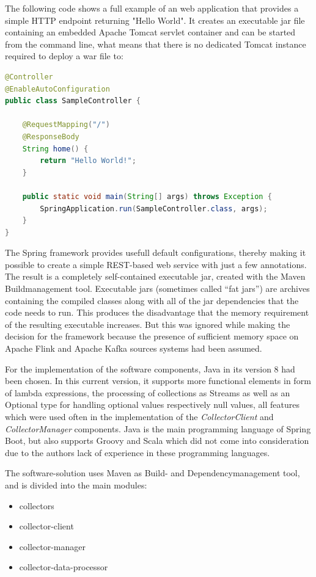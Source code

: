 The following code shows a full example of an web application that provides a simple
HTTP endpoint returning "Hello World". It creates an executable jar file containing
an embedded Apache Tomcat servlet container and can be started from the command line, what means that there is no
dedicated Tomcat instance required to deploy a war file to:
\begin{lstlisting}[caption={Spring Boot "Hello World"}, captionpos=b, label={lst:spring-boot-hello-world},language=Java]
@Controller
@EnableAutoConfiguration
public class SampleController {

    @RequestMapping("/")
    @ResponseBody
    String home() {
        return "Hello World!";
    }

    public static void main(String[] args) throws Exception {
        SpringApplication.run(SampleController.class, args);
    }
}
\end{lstlisting}

The Spring framework provides usefull default configurations, thereby making it possible to create a simple REST-based web service
with just a few annotations. The result is a completely self-contained executable jar, created with the Maven
Buildmanagement tool. Executable jars (sometimes called “fat jars”) are archives containing the compiled classes along with
all of the jar dependencies that the code needs to run. This produces the disadvantage that the memory requirement of the
resulting executable increases. But this was ignored while making the decision for the framework because the presence of
sufficient memory space on Apache Flink and Apache Kafka sources systems had been assumed.

For the implementation of the software components, Java in its version 8 had been chosen. In this current version,
it supports more functional elements in form of lambda expressions, the processing of collections as Streams as well
as an Optional type for handling optional values respectively null values, all features which were used often in the
implementation of the \textit{CollectorClient} and \textit{CollectorManager} components. Java is the main programming
language of Spring Boot, but also supports Groovy and Scala which did not come into consideration due to the authors lack of
experience in these programming languages.

The software-solution uses Maven as Build- and Dependencymanagement tool, and is divided into the main modules:

\begin{itemize}
	\item collectors
	\item collector-client
	\item collector-manager
	\item collector-data-processor
\end{itemize}

